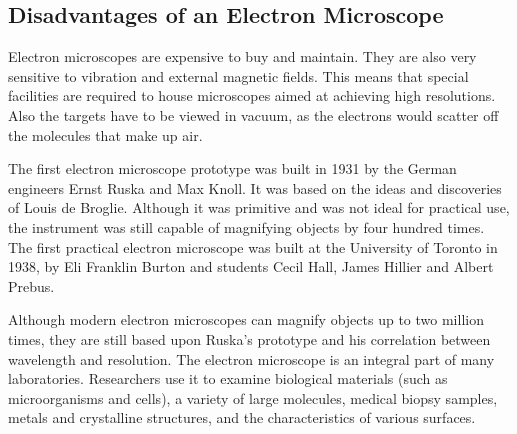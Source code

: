 \subsection{Disadvantages of an Electron Microscope}
Electron microscopes are expensive to buy and maintain. They are also very sensitive to vibration and external magnetic fields. This means that special facilities are required to house microscopes aimed at achieving high resolutions. Also the targets have to be viewed in vacuum, as the electrons would scatter off the molecules that make up air. 


\begin{IFact}
{The first electron microscope prototype was built in 1931 by the German engineers Ernst Ruska and Max Knoll. It was based on the ideas and discoveries of Louis de Broglie. Although it was primitive and was not ideal for practical use, the instrument was still capable of magnifying objects by four hundred times. The first practical electron microscope was built at the University of Toronto in 1938, by Eli Franklin Burton and students Cecil Hall, James Hillier and Albert Prebus.

Although modern electron microscopes can magnify objects up to two million times, they are still based upon Ruska's prototype and his correlation between wavelength and resolution. The electron microscope is an integral part of many laboratories. Researchers use it to examine biological materials (such as microorganisms and cells), a variety of large molecules, medical biopsy samples, metals and crystalline structures, and the characteristics of various surfaces.}
\end{IFact}

